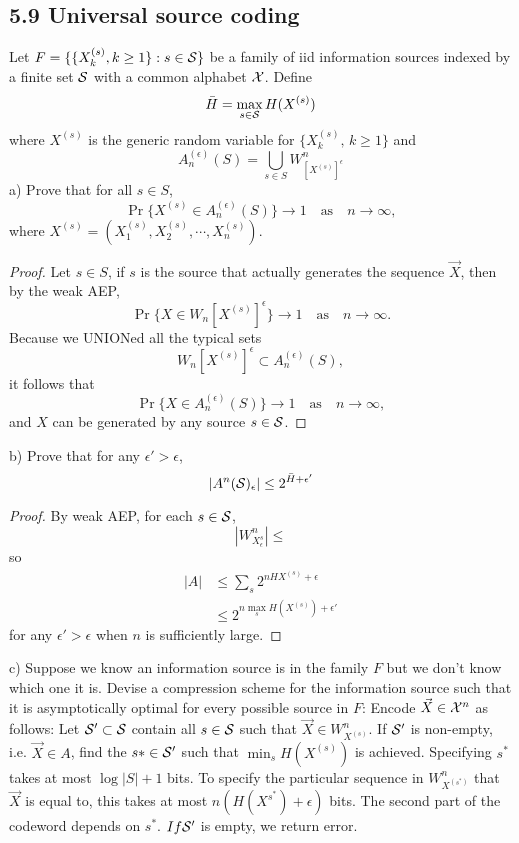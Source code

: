 \documentclass[../main.tex]{subfiles}
\begin{document}
 \subsection*{5.9 Universal source coding}
 Let $F=\{\{X_k^{(s)}, k\geq 1\}: s\in \S\}$ be a family of iid information sources indexed by a finite set $\S$ with a common alphabet $\X$. Define \[
 \Bar{H} = \max_{s\in \S}H(X^{(s)})
 \] where $X^{(s)}$ is the generic random variable for $\{X^{(s)}_k, \, k \geq 1\}$ and \[
 A_n^{(\epsilon)}(S) = \bigcup_{s \in S} W^{n}_{[X^{(s)}]^{\epsilon}}
 \]
 a) Prove that for all \(s \in S\),
\[
\Pr\{X^{(s)} \in A_n^{(\epsilon)}(S)\} \to 1 \quad \text{as} \quad n \to \infty,
\]
where \(X^{(s)} = (X^{(s)}_1, X^{(s)}_2, \cdots, X^{(s)}_n)\).
\begin{proof}
    Let \(s \in S\), if \(s\) is the source that actually generates the sequence \(\vec X\),
then by the weak AEP, 
\[
\Pr\{X \in W_n[X^{(s)}]^{\epsilon}\} \to 1 \quad \text{as} \quad n \to \infty.
\]
Because we UNIONed all the typical sets
\[
W_n[X^{(s)}]^{\epsilon} \subset A_n^{(\epsilon)}(S), 
\]
it follows that
\[
\Pr\{X \in A_n^{(\epsilon)}(S)\} \to 1 \quad \text{as} \quad n \to \infty,
\]
and $X$ can be generated by any source $s\in\S$.
\end{proof}
b) Prove that for any $\epsilon' > \epsilon$, \[
|A^{n}(\S)_\epsilon| \leq  2^{\Bar{H}+\epsilon'}
\]
\begin{proof}
    By weak AEP, for each $s\in\S$, \[
    |W^{n}_{X^{s}_\epsilon}| \leq 
    \]
    so \begin{align*}
    |A|&\leq \sum_s 2^{nHX^{(s)}+\epsilon}\\
    &\leq 2^{n\max_s H(X^{(s)})+\epsilon'}
    \end{align*}
    for any \textbf{$\epsilon'>\epsilon$} when $n$ is sufficiently large.
\end{proof}
c) Suppose we know an information source is in the family $F$ but we don't know which one it is. Devise a compression scheme for the information source such that it is asymptotically optimal for every possible source in $F$:
Encode $\vec X\in \X^n$ as follows: Let $\S'\subset \S$ contain all $s\in\S$ such that $\vec X\in W^{n}_{X^(s)}.$ If $\S'$ is non-empty, i.e. $\vec X\in A$, find the $s*\in\S'$ such that $\min_sH(X^{(s)})$ is achieved. Specifying $s^*$ takes at most $\log |S| + 1$ bits. To specify the particular sequence in $W^{n}_{X^{(s^*)}}$ that $\vec X$ is equal to, this takes at most $n(H(X^{s^*})+\epsilon)$ bits. The second part of the codeword depends on $s^*$. $If \S'$ is empty, we return error.
 
\end{document}
